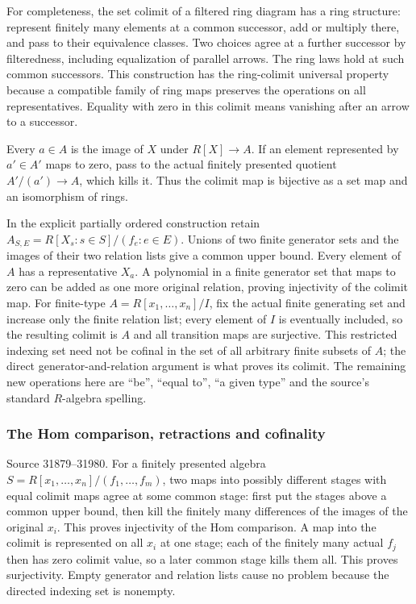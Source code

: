 For completeness, the set colimit of a filtered ring diagram has a ring structure: represent finitely many elements at a common successor, add or multiply there, and pass to their equivalence classes. Two choices agree at a further successor by filteredness, including equalization of parallel arrows. The ring laws hold at such common successors. This construction has the ring-colimit universal property because a compatible family of ring maps preserves the operations on all representatives. Equality with zero in this colimit means vanishing after an arrow to a successor.

Every \(a\in A\) is the image of \(X\) under \(R[X]\to A\). If an element represented by \(a'\in A'\) maps to zero, pass to the actual finitely presented quotient \(A'/(a')\to A\), which kills it. Thus the colimit map is bijective as a set map and an isomorphism of rings.

In the explicit partially ordered construction retain \(A_{S,E}=R[X_s:s\in S]/(f_e:e\in E)\). Unions of two finite generator sets and the images of their two relation lists give a common upper bound. Every element of \(A\) has a representative \(X_a\). A polynomial in a finite generator set that maps to zero can be added as one more original relation, proving injectivity of the colimit map. For finite-type \(A=R[x_1,\ldots,x_n]/I\), fix the actual finite generating set and increase only the finite relation list; every element of \(I\) is eventually included, so the resulting colimit is \(A\) and all transition maps are surjective. This restricted indexing set need not be cofinal in the set of all arbitrary finite subsets of \(A\); the direct generator-and-relation argument is what proves its colimit. The remaining new operations here are ``be'', ``equal to'', ``a given type'' and the source's standard \(R\)-algebra spelling.

\subsubsection{The Hom comparison, retractions and cofinality}\label{algebra-proof-036-the-hom-comparison-retractions-and-cofinality}

Source 31879--31980. For a finitely presented algebra \(S=R[x_1,\ldots,x_n]/(f_1,\ldots,f_m)\), two maps into possibly different stages with equal colimit maps agree at some common stage: first put the stages above a common upper bound, then kill the finitely many differences of the images of the original \(x_i\). This proves injectivity of the Hom comparison. A map into the colimit is represented on all \(x_i\) at one stage; each of the finitely many actual \(f_j\) then has zero colimit value, so a later common stage kills them all. This proves surjectivity. Empty generator and relation lists cause no problem because the directed indexing set is nonempty.

